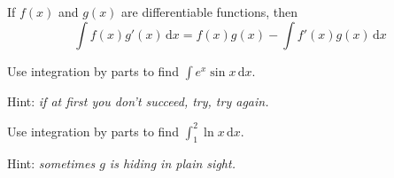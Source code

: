 \documentclass{workbook}
\begin{document}
\begin{slide}
	\question

	\begin{theorem}
		If $f(x)$ and $g(x)$ are differentiable functions, then
		\[
			\int f(x)g'(x)\,\mathrm d x
			= f(x)g(x) -
			\int f'(x)g(x)\,\mathrm d x
		\]
	\end{theorem}

	\begin{parts}
		\item Use integration by parts to find $\displaystyle \int e^x\sin x\,\mathrm d x$.

		Hint: \emph{if at first you don't succeed, try, try again.}

		\item Use integration by parts to find $\displaystyle \int_1^2 \ln x\,\mathrm d x$.

		Hint: \emph{sometimes $g$ is hiding in plain sight.}
	\end{parts}
\end{slide}






\end{document}
